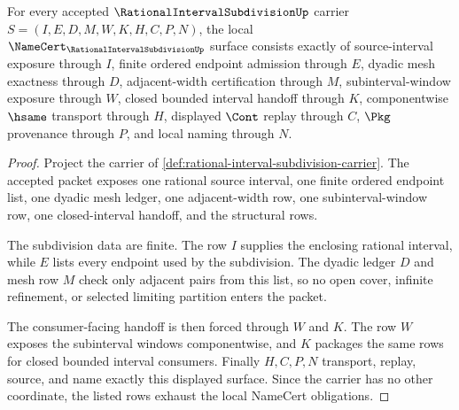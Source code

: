 \begin{theorem}
\label{thm:rational-interval-subdivision-namecert-obligations}
For every accepted $\RationalIntervalSubdivisionUp$ carrier $S=(I,E,D,M,W,K,H,C,P,N)$, the local $\NameCert_{\RationalIntervalSubdivisionUp}$ surface consists exactly of source-interval exposure through $I$, finite ordered endpoint admission through $E$, dyadic mesh exactness through $D$, adjacent-width certification through $M$, subinterval-window exposure through $W$, closed bounded interval handoff through $K$, componentwise $\hsame$ transport through $H$, displayed $\Cont$ replay through $C$, $\Pkg$ provenance through $P$, and local naming through $N$.
\end{theorem}
\begin{proof}
Project the carrier of \autoref{def:rational-interval-subdivision-carrier}. The accepted packet exposes one rational source interval, one finite ordered endpoint list, one dyadic mesh ledger, one adjacent-width row, one subinterval-window row, one closed-interval handoff, and the structural rows.

The subdivision data are finite. The row $I$ supplies the enclosing rational interval, while $E$ lists every endpoint used by the subdivision. The dyadic ledger $D$ and mesh row $M$ check only adjacent pairs from this list, so no open cover, infinite refinement, or selected limiting partition enters the packet.

The consumer-facing handoff is then forced through $W$ and $K$. The row $W$ exposes the subinterval windows componentwise, and $K$ packages the same rows for closed bounded interval consumers. Finally $H,C,P,N$ transport, replay, source, and name exactly this displayed surface. Since the carrier has no other coordinate, the listed rows exhaust the local NameCert obligations.
\end{proof}

